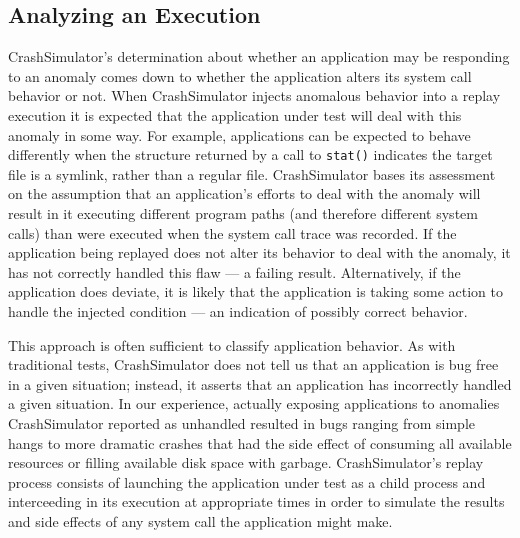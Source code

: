 \subsection{Analyzing an Execution}

CrashSimulator's determination about whether an application may be
responding to an anomaly comes down to whether the application alters its
system call behavior or not.  When CrashSimulator injects anomalous
behavior into a replay execution it is expected that the application under
test will deal with this anomaly in some way. For example, applications can
be expected to behave differently when the structure returned by a call to
{\tt stat()} indicates the target file is a symlink, rather than a regular
file.  CrashSimulator bases its assessment on the assumption that an
application's efforts to deal with the anomaly will result in it executing
different program paths (and therefore different system calls) than were
executed when the system call trace was recorded.  If the application being
replayed does not alter its behavior to deal with the anomaly, it has not
correctly handled this flaw --- a failing result.  Alternatively, if the
application does deviate, it is likely that the application is taking some
action to handle the injected condition --- an indication of possibly
correct behavior.

This approach is often sufficient to classify application behavior.  As
with traditional tests, CrashSimulator does not tell us that an application
is bug free in a given situation; instead, it asserts that an application
has incorrectly handled a given situation.  In our experience, actually
exposing applications to anomalies CrashSimulator reported as unhandled
resulted in bugs ranging from simple hangs to more dramatic crashes that
had the side effect of consuming all available resources or filling
available disk space with garbage.  CrashSimulator's replay process
consists of launching the application under test as a child process and
interceeding in its execution at appropriate times in order to simulate the
results and side effects of any system call the application might make.
